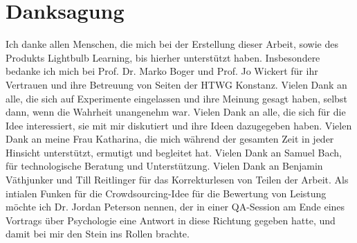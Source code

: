 \chapter*{Danksagung}

Ich danke allen Menschen, die mich bei der Erstellung dieser Arbeit, sowie des Produkts Lightbulb Learning, bis hierher unterstützt haben. Insbesondere bedanke ich mich bei Prof. Dr. Marko Boger und Prof. Jo Wickert für ihr Vertrauen und ihre Betreuung von Seiten der HTWG Konstanz. Vielen Dank an alle, die sich auf Experimente eingelassen und ihre Meinung gesagt haben, selbst dann, wenn die Wahrheit unangenehm war. Vielen Dank an alle, die sich für die Idee interessiert, sie mit mir diskutiert und ihre Ideen dazugegeben haben. Vielen Dank an meine Frau Katharina, die mich während der gesamten Zeit in jeder Hinsicht unterstützt, ermutigt und begleitet hat. Vielen Dank an Samuel Bach, für technologische Beratung und Unterstützung. Vielen Dank an Benjamin Väthjunker und Till Reitlinger für das Korrekturlesen von Teilen der Arbeit. Als intialen Funken für die Crowdsourcing-Idee für die Bewertung von Leistung möchte ich Dr. Jordan Peterson nennen, der in einer QA-Session am Ende eines Vortrags über Psychologie eine Antwort in diese Richtung gegeben hatte, und damit bei mir den Stein ins Rollen brachte.
